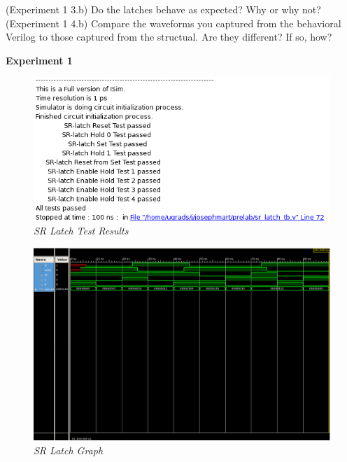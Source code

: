 \documentclass[a4paper,12pt]{article}
\begin{document}
  (Experiment 1 3.b) Do the latches behave as expected? Why or why not? \\

  (Experiment 1 4.b) Compare the waveforms you captured from the behavioral Verilog
  to those captured from the structual. Are they different? If so, how?

  \textbf{Experiment 1}
\newpage
  \begin{figure}[h]
    \begin{center}
      \includegraphics[scale=0.5]{sr_latch_tests.png}
      \caption{\textit{SR Latch Test Results}}
    \end{center}
  \end{figure}
  \newpage
  \begin{figure}[h]
    \begin{center}
      \includegraphics[scale=0.2]{sr_latch_graph.png}
      \caption{\textit{SR Latch Graph}}
    \end{center}
  \end{figure}
  
\end{document}

